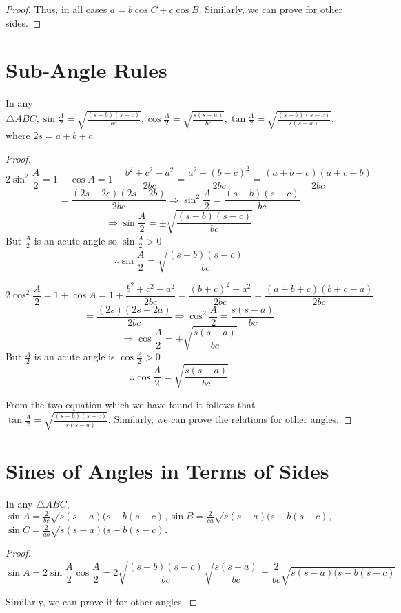 \begin{proof}
  \noindent Thus, in all cases $a = b\cos C + c\cos B$. Similarly, we can prove for other sides.
\end{proof}

\section{Sub-Angle Rules}
\begin{theorem}
  In any $\triangle ABC, \sin\frac{A}{2}= \sqrt{\frac{(s - b)(s - c)}{bc}}, \cos\frac{A}{2} = \sqrt{\frac{s(s - a)}{bc}},
  \tan\frac{A}{2} = \sqrt{\frac{(s - b)(s - c)}{s(s - a)}}$, where $2s = a + b + c$.
\end{theorem}

\begin{proof}
  $$2\sin^2\frac{A}{2} = 1 - \cos A = 1 - \frac{b^2 + c^2 - a^2}{2bc} = \frac{a^2 - (b - c)^2}{2bc} = \frac{(a + b - c)(a + c -
    b)}{2bc}$$
  $$= \frac{(2s - 2c)(2s - 2b)}{2bc} \Rightarrow \sin^2\frac{A}{2} = \frac{(s - b)(s - c)}{bc}$$
  $$\Rightarrow \sin\frac{A}{2} = \pm\sqrt{\frac{(s - b)(s - c)}{bc}}$$
  But $\frac{A}{2}$ is an acute angle so $\sin\frac{A}{2}> 0$ $$\therefore \sin\frac{A}{2} = \sqrt{\frac{(s - b)(s - c)}{bc}}$$

  $$2\cos^2\frac{A}{2} = 1 + \cos A = 1 + \frac{b^2 + c^2 - a^2}{2bc} = \frac{(b + c)^2 - a^2}{2bc} = \frac{(a + b + c)(b + c -
    a)}{2bc}$$
  $$= \frac{(2s)(2s - 2a)}{2bc} \Rightarrow \cos^2\frac{A}{2} = \frac{s(s - a)}{bc}$$
  $$\Rightarrow \cos\frac{A}{2} = \pm\sqrt{\frac{s(s - a)}{bc}}$$
  But $\frac{A}{2}$ is an acute angle is $\cos\frac{A}{2} > 0$ $$\therefore \cos\frac{A}{2} = \sqrt{\frac{s(s - a)}{bc}}$$

  \noindent From the two equation which we have found it follows that $\tan\frac{A}{2} = \sqrt{\frac{(s - b)(s - c)}{s(s -
      a)}}$. Similarly, we can prove the relations for other angles.
\end{proof}

\section{Sines of Angles in Terms of Sides}
\begin{theorem}
  In any $\triangle ABC$, $\sin A = \frac{2}{bc}\sqrt{s(s - a)(s - b(s - c)}, \sin B = \frac{2}{ca}\sqrt{s(s - a)(s - b(s - c)},$
  $\sin C = \frac{2}{ab}\sqrt{s(s - a)(s - b(s - c)}$.
\end{theorem}

\begin{proof}
  $$\sin A = 2\sin\frac{A}{2}\cos\frac{A}{2} = 2\sqrt{\frac{(s - b)(s - c)}{bc}}\sqrt{\frac{s(s - a)}{bc}} = \frac{2}{bc}\sqrt{s(s
    - a)(s - b(s - c)}$$

  \noindent Similarly, we can prove it for other angles.
\end{proof}

